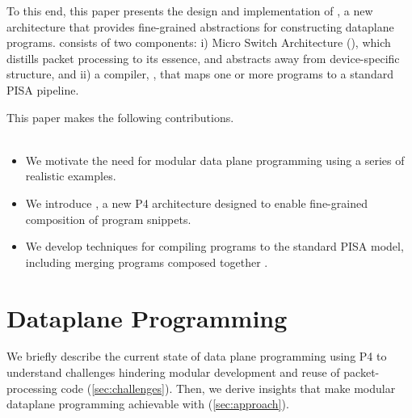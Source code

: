 \documentclass[letterpaper,twocolumn,10pt]{article}
\begin{document}
To this end, this paper presents the design and implementation of
\ulang, a new architecture that provides fine-grained abstractions for
constructing dataplane programs. \ulang consists of two components: i)
Micro Switch Architecture (\uarch), which distills packet processing
to its essence, and abstracts away from device-specific structure, and
ii) a compiler, \ucomp, that maps one or more \uarch programs to a
standard PISA pipeline.
\\

This paper makes the following contributions.\\
\\
\begin{itemize}
\item We motivate the need for modular data plane programming using a
  series of realistic examples.
\item We introduce \uarch, a new P4 architecture designed to enable
  fine-grained composition of program snippets.
\item We develop techniques for compiling \uarch programs to the
  standard PISA model, including merging programs composed together 
  .
\end{itemize}





\section{Dataplane Programming}
\label{sec:background}

We briefly describe the current state of data plane programming using
P4 to understand challenges hindering modular development and reuse of
packet-processing code (\cref{sec:challenges}). Then, we derive
insights that make modular dataplane programming achievable with
\ulang (\cref{sec:approach}).
\end{document}

